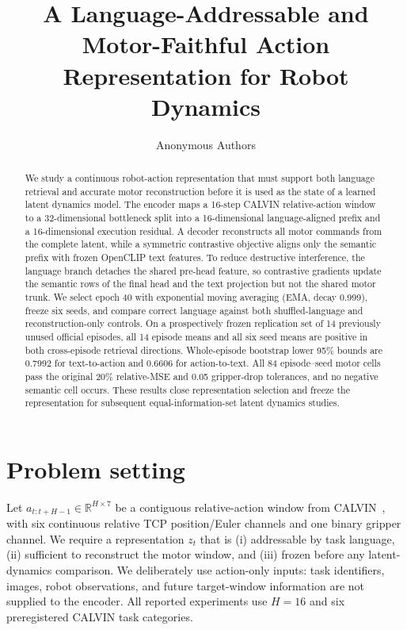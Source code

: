 \documentclass{article}
\title{A Language-Addressable and Motor-Faithful Action Representation for Robot Dynamics}
\author{Anonymous Authors}
\newcommand{\R}{\mathbb{R}}
\begin{document}
\maketitle

\begin{abstract}
We study a continuous robot-action representation that must support both
language retrieval and accurate motor reconstruction before it is used as the
state of a learned latent dynamics model.  The encoder maps a 16-step CALVIN
relative-action window to a 32-dimensional bottleneck split into a
16-dimensional language-aligned prefix and a 16-dimensional execution
residual.  A decoder reconstructs all motor commands from the complete latent,
while a symmetric contrastive objective aligns only the semantic prefix with
frozen OpenCLIP text features.  To reduce destructive interference, the
language branch detaches the shared pre-head feature, so contrastive gradients
update the semantic rows of the final head and the text projection but not the
shared motor trunk.  We select epoch 40 with exponential moving averaging
(EMA, decay 0.999), freeze six seeds, and compare correct language against both
shuffled-language and reconstruction-only controls.  On a prospectively frozen
replication set of 14 previously unused official episodes, all 14 episode means
and all six seed means are positive in both cross-episode retrieval directions.
Whole-episode bootstrap lower 95\% bounds are 0.7992 for text-to-action and
0.6606 for action-to-text.  All 84 episode--seed motor cells pass the original
20\% relative-MSE and 0.05 gripper-drop tolerances, and no negative semantic
cell occurs.  These results close representation selection and freeze the
representation for subsequent equal-information-set latent dynamics studies.
\end{abstract}

\section{Problem setting}
\label{sec:setting}

Let $a_{t:t+H-1}\in\R^{H\times 7}$ be a contiguous relative-action window
from CALVIN~\citep{calvin}, with six continuous relative TCP position/Euler
channels and one binary gripper channel.  We require a representation $z_t$ that is
(i) addressable by task language, (ii) sufficient to reconstruct the motor
window, and (iii) frozen before any latent-dynamics comparison.  We deliberately
use action-only inputs: task identifiers, images, robot observations, and
future target-window information are not supplied to the encoder.  All reported
experiments use $H=16$ and six preregistered CALVIN task categories.
\end{document}
